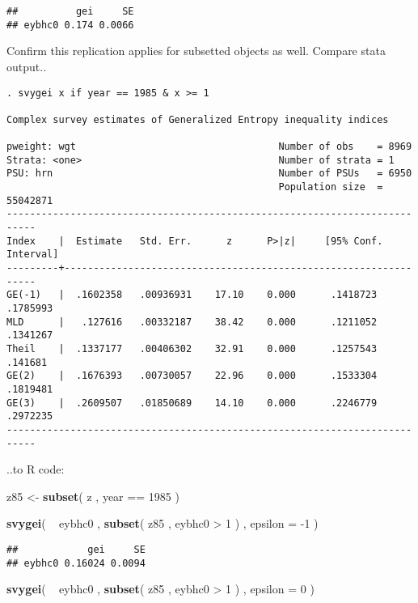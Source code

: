 \documentclass[]{book}
\newenvironment{Shaded}{\begin{snugshade}}{\end{snugshade}}
\newcommand{\KeywordTok}[1]{\textcolor[rgb]{0.13,0.29,0.53}{\textbf{{#1}}}}
\newcommand{\DataTypeTok}[1]{\textcolor[rgb]{0.13,0.29,0.53}{{#1}}}
\newcommand{\DecValTok}[1]{\textcolor[rgb]{0.00,0.00,0.81}{{#1}}}
\newcommand{\StringTok}[1]{\textcolor[rgb]{0.31,0.60,0.02}{{#1}}}
\newcommand{\NormalTok}[1]{{#1}}
\begin{document}
\begin{verbatim}
##          gei     SE
## eybhc0 0.174 0.0066
\end{verbatim}

Confirm this replication applies for subsetted objects as well. Compare
stata output..

\begin{verbatim}
. svygei x if year == 1985 & x >= 1

Complex survey estimates of Generalized Entropy inequality indices
 
pweight: wgt                                   Number of obs    = 8969
Strata: <one>                                  Number of strata = 1
PSU: hrn                                       Number of PSUs   = 6950
                                               Population size  = 55042871
---------------------------------------------------------------------------
Index    |  Estimate   Std. Err.      z      P>|z|     [95% Conf. Interval]
---------+-----------------------------------------------------------------
GE(-1)   |  .1602358   .00936931    17.10    0.000      .1418723   .1785993
MLD      |   .127616   .00332187    38.42    0.000      .1211052   .1341267
Theil    |  .1337177   .00406302    32.91    0.000      .1257543    .141681
GE(2)    |  .1676393   .00730057    22.96    0.000      .1533304   .1819481
GE(3)    |  .2609507   .01850689    14.10    0.000      .2246779   .2972235
---------------------------------------------------------------------------
\end{verbatim}

..to R code:

\begin{Shaded}
\begin{Highlighting}[]
\NormalTok{z85 <-}\StringTok{ }\KeywordTok{subset}\NormalTok{( z , year ==}\StringTok{ }\DecValTok{1985} \NormalTok{)}

\KeywordTok{svygei}\NormalTok{( ~}\StringTok{ }\NormalTok{eybhc0 , }\KeywordTok{subset}\NormalTok{( z85 , eybhc0 >}\StringTok{ }\DecValTok{1} \NormalTok{) , }\DataTypeTok{epsilon =} \NormalTok{-}\DecValTok{1} \NormalTok{)}
\end{Highlighting}
\end{Shaded}

\begin{verbatim}
##            gei     SE
## eybhc0 0.16024 0.0094
\end{verbatim}

\begin{Shaded}
\begin{Highlighting}[]
\KeywordTok{svygei}\NormalTok{( ~}\StringTok{ }\NormalTok{eybhc0 , }\KeywordTok{subset}\NormalTok{( z85 , eybhc0 >}\StringTok{ }\DecValTok{1} \NormalTok{) , }\DataTypeTok{epsilon =} \DecValTok{0} \NormalTok{)}
\end{Highlighting}
\end{Shaded}
\end{document}
